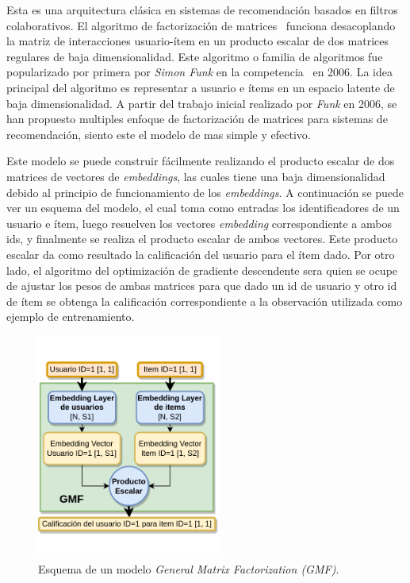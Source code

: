 \documentclass[11pt,a4paper,twoside]{thesis}
\begin{document}
Esta es una arquitectura clásica en sistemas de recomendación basados en
filtros colaborativos. El algoritmo de factorización de matrices~\cite{afm}
funciona desacoplando la matriz de interacciones usuario-ítem en un producto
escalar de dos matrices regulares de baja dimensionalidad. Este algoritmo o
familia de algoritmos fue popularizado por primera por \textit{Simon Funk} en
la competencia~\cite{netflixprize} en 2006. La idea principal del algoritmo es
representar a usuario e ítems en un espacio latente de baja dimensionalidad. A
partir del trabajo inicial realizado por \textit{Funk} en 2006, se han
propuesto multiples enfoque de factorización de matrices para sistemas de
recomendación, siento este el modelo de mas simple y efectivo.

Este modelo se puede construir fácilmente realizando el producto escalar de dos
matrices de vectores de \textit{embeddings}, las cuales tiene una baja
dimensionalidad debido al principio de funcionamiento de los
\textit{embeddings}. A continuación se puede ver un esquema del modelo, el cual
toma como entradas los identificadores de un usuario e ítem, luego resuelven
los vectores \textit{embedding} correspondiente a ambos ids, y finalmente se
realiza el producto escalar de ambos vectores. Este producto escalar da como
resultado la calificación del usuario para el ítem dado. Por otro lado, el
algoritmo del optimización de gradiente descendente sera quien se ocupe de
ajustar los pesos de ambas matrices para que dado un id de usuario y otro id de
ítem se obtenga la calificación correspondiente a la observación utilizada como
ejemplo de entrenamiento.

\begin{figure}[h!]
	\centering
	\includegraphics[width=6cm]{./images/GMF.png}
	\caption{
		Esquema de un modelo \textit{General Matrix Factorization (GMF)}.
	}
	\label{fig:GMFModel}
\end{figure}
\end{document}
